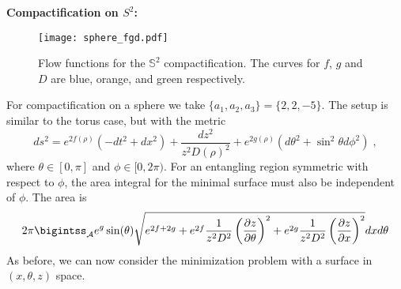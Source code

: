 \documentclass[11 pt]{article}
\begin{document}
\bigskip
{\bf Compactification on $S^2$:}
\begin{figure}
    \centering
    \texttt{[image: sphere\_fgd.pdf]}
    \caption{Flow functions for the $\mathbb{S}^2$ compactification. The curves for $f$, $g$ and $D$ are blue, orange, and green respectively.}
    \label{fig:sphere_fgd}
\end{figure}
For compactification on a sphere we take $\{a_1,a_2,a_3\}=\{2,2,-5\}$. The setup is similar to the torus case, but with the metric
\begin{equation}\label{sphere metric}
    ds^2=e^{2f(\rho)}(-dt^2+dx^2) + \frac{dz^2}{z^2 D(\rho)^2} + e^{2g(\rho)}(d\theta^2+\sin^2\theta d\phi^2)\;,
\end{equation}
where $\theta\in[0,\pi]$ and $\phi\in[0,2\pi)$. For an entangling region symmetric with respect to $\phi$, the area integral for the minimal surface must also be independent of $\phi$. The area is
\begin{equation}\label{sphere area integral}
    2\pi\bigintss_{\cal A} {e^{g}\sin(\theta)\sqrt{e^{2f+2g}+e^{2f}\frac{1}{z^2 D^2}\left(\frac{\partial z}{\partial\theta}\right)^2 + e^{2g}\frac{1}{z^2 D^2}\left(\frac{\partial z}{\partial x}\right)^2}dx d\theta}
\end{equation}
As before, we can now consider the minimization problem with a surface in $(x,\theta,z)$ space.





\end{document}
